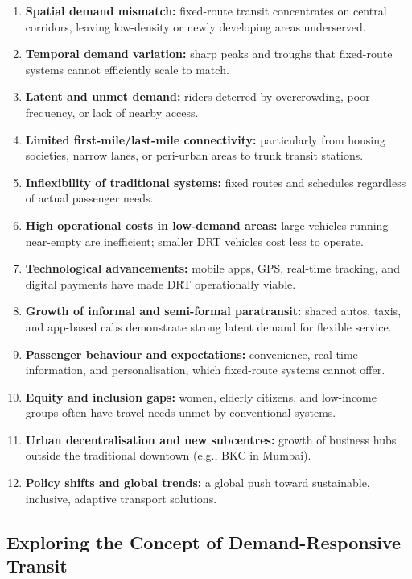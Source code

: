 \documentclass[12pt]{article}
\begin{document}
\begin{enumerate}[nosep]
  \item \textbf{Spatial demand mismatch:} fixed-route transit concentrates on
    central corridors, leaving low-density or newly developing areas underserved.
  \item \textbf{Temporal demand variation:} sharp peaks and troughs that
    fixed-route systems cannot efficiently scale to match.
  \item \textbf{Latent and unmet demand:} riders deterred by overcrowding, poor
    frequency, or lack of nearby access.
  \item \textbf{Limited first-mile/last-mile connectivity:} particularly from
    housing societies, narrow lanes, or peri-urban areas to trunk transit stations.
  \item \textbf{Inflexibility of traditional systems:} fixed routes and schedules
    regardless of actual passenger needs.
  \item \textbf{High operational costs in low-demand areas:} large vehicles
    running near-empty are inefficient; smaller DRT vehicles cost less to operate.
  \item \textbf{Technological advancements:} mobile apps, GPS, real-time tracking,
    and digital payments have made DRT operationally viable.
  \item \textbf{Growth of informal and semi-formal paratransit:} shared autos,
    taxis, and app-based cabs demonstrate strong latent demand for flexible service.
  \item \textbf{Passenger behaviour and expectations:} convenience, real-time
    information, and personalisation, which fixed-route systems cannot offer.
  \item \textbf{Equity and inclusion gaps:} women, elderly citizens, and
    low-income groups often have travel needs unmet by conventional systems.
  \item \textbf{Urban decentralisation and new subcentres:} growth of business
    hubs outside the traditional downtown (e.g., BKC in Mumbai).
  \item \textbf{Policy shifts and global trends:} a global push toward
    sustainable, inclusive, adaptive transport solutions.
\end{enumerate}

\subsection{Exploring the Concept of Demand-Responsive Transit}
\end{document}
